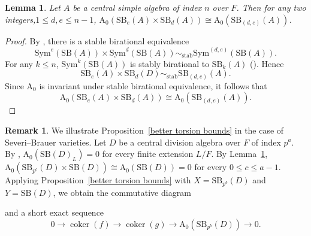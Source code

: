 \documentclass[10pt]{amsart}
\theoremstyle{plain}
\newtheorem{lemma}[thm]{Lemma}
\theoremstyle{definition}
\newtheorem{remark}[thm]{Remark}
\begin{document}
\begin{lemma}\label{Symmetric powers and stable birationality}
    Let \(A \) be a central simple algebra of index \(n\) over \(F\). Then for any two integers,\(1 \leq d,e \leq n-1\), \(\mathrm{A_0}(\mathrm{SB}_e(A) \times \mathrm{SB}_d(A)) \cong \mathrm{A_0}(\mathrm{SB}_{(d,e)}(A))\).
\end{lemma}
\begin{proof}
    By \cite[Theorem~1.1(6)]{Kollar}, there is a stable birational equivalence
\[
\mathrm{Sym}^e(\mathrm{SB}(A)) \times \mathrm{Sym}^d(\mathrm{SB}(A)) \sim_{\mathrm{stab}} \mathrm{Sym}^{(d,e)}(\mathrm{SB}(A)).
\]
For any \(k \le n\), \(\mathrm{Sym}^k(\mathrm{SB}(A))\) is stably birational to \(\mathrm{SB}_k(A)\) (\cite[Theorem~1.5]{symmetricpowers}). Hence
\[
\mathrm{SB}_e(A) \times \mathrm{SB}_d(D) \sim_{\mathrm{stab}} \mathrm{SB}_{(d,e)}(A).
\]
Since \(\mathrm{A_0}\) is invariant under stable birational equivalence, it follows that 
\[
\mathrm{A_0}(\mathrm{SB}_e(A) \times \mathrm{SB}_d(A)) \cong \mathrm{A_0}(\mathrm{SB}_{(d,e)}(A)).
\]
\end{proof}


\begin{remark}
We illustrate Proposition~\ref{better torsion bounds} in the case of Severi--Brauer varieties. Let \(D\) be a central division algebra over \(F\) of index \(p^a\). By \cite[Corollary~7.3]{MC}, \(\mathrm{A_0}(\mathrm{SB}(D)_L)=0\) for every finite extension \(L/F\). By Lemma~\ref{Symmetric powers and stable birationality}, \(\mathrm{A_0}(\mathrm{SB}_{p^c}(D) \times \mathrm{SB}(D))\cong \mathrm{A_0}(\mathrm{SB}(D))=0\) for every \(0 \leq c \leq a-1\). Applying Proposition~\ref{better torsion bounds} with \(X=\mathrm{SB}_{p^b}(D)\) and \(Y=\mathrm{SB}(D)\), we obtain the commutative diagram
\begin{center}
\end{center}
and a short exact sequence
\[
0 \to \operatorname{coker}(f) \to \operatorname{coker}(g) \to \mathrm{A_0}(\mathrm{SB}_{p^b}(D)) \to 0.
\]
\end{remark}
\end{document}
